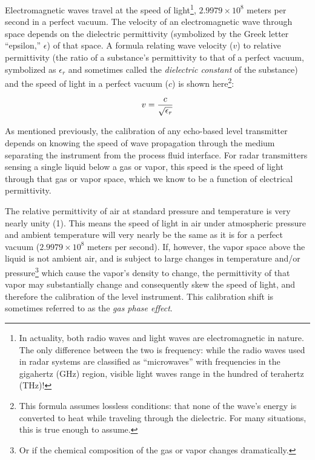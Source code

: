 Electromagnetic waves travel at the speed of light\footnote{In actuality, both radio waves and light waves are electromagnetic in nature.  The only difference between the two is frequency: while the radio waves used in radar systems are classified as ``microwaves'' with frequencies in the gigahertz (GHz) region, visible light waves range in the hundred of terahertz (THz)!}, $2.9979 \times 10^8$ meters per second in a perfect vacuum.  The velocity of an electromagnetic wave through space depends on the dielectric permittivity (symbolized by the Greek letter ``epsilon,'' $\epsilon$) of that space.  A formula relating wave velocity ($v$) to relative permittivity (the ratio of a substance's permittivity to that of a perfect vacuum, symbolized as $\epsilon_r$ and sometimes called the \textit{dielectric constant} of the substance) and the speed of light in a perfect vacuum ($c$) is shown here\footnote{This formula assumes lossless conditions: that none of the wave's energy is converted to heat while traveling through the dielectric.  For many situations, this is true enough to assume.}:   

$$v = {c \over \sqrt{\epsilon_r}}$$

\filbreak

As mentioned previously, the calibration of any echo-based level transmitter depends on knowing the speed of wave propagation through the medium separating the instrument from the process fluid interface.  For radar transmitters sensing a single liquid below a gas or vapor, this speed is the speed of light through that gas or vapor space, which we know to be a function of electrical permittivity.

The relative permittivity of air at standard pressure and temperature is very nearly unity (1).  This means the speed of light in air under atmospheric pressure and ambient temperature will very nearly be the same as it is for a perfect vacuum ($2.9979 \times 10^8$ meters per second).  If, however, the vapor space above the liquid is not ambient air, and is subject to large changes in temperature and/or pressure\footnote{Or if the chemical composition of the gas or vapor changes dramatically.} which cause the vapor's density to change, the permittivity of that vapor may substantially change and consequently skew the speed of light, and therefore the calibration of the level instrument.  This calibration shift is sometimes referred to as the \textit{gas phase effect}.  

